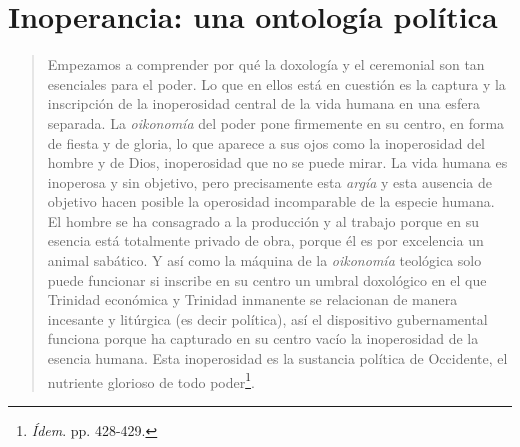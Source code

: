 \section{Inoperancia: una ontología política}

\begin{quote}
Empezamos a comprender por qué la doxología y el ceremonial son tan
esenciales para el poder. Lo que en ellos está en cuestión es la captura
y la inscripción de la inoperosidad central de la vida humana en una
esfera separada. La \emph{oikonomía} del poder pone firmemente en su
centro, en forma de fiesta y de gloria, lo que aparece a sus ojos como
la inoperosidad del hombre y de Dios, inoperosidad que no se puede
mirar. La vida humana es inoperosa y sin objetivo, pero precisamente
esta \emph{argía} y esta ausencia de objetivo hacen posible la
operosidad incomparable de la especie humana. El hombre se ha consagrado
a la producción y al trabajo porque en su esencia está totalmente
privado de obra, porque él es por excelencia un animal sabático. Y así
como la máquina de la \emph{oikonomía} teológica solo puede funcionar si
inscribe en su centro un umbral doxológico en el que Trinidad económica
y Trinidad inmanente se relacionan de manera incesante y litúrgica (es
decir política), así el dispositivo gubernamental funciona porque ha
capturado en su centro vacío la inoperosidad de la esencia humana. Esta
inoperosidad es la sustancia política de Occidente, el nutriente
glorioso de todo poder\footnote{\emph{Ídem}. pp. 428-429.}.
\end{quote}

